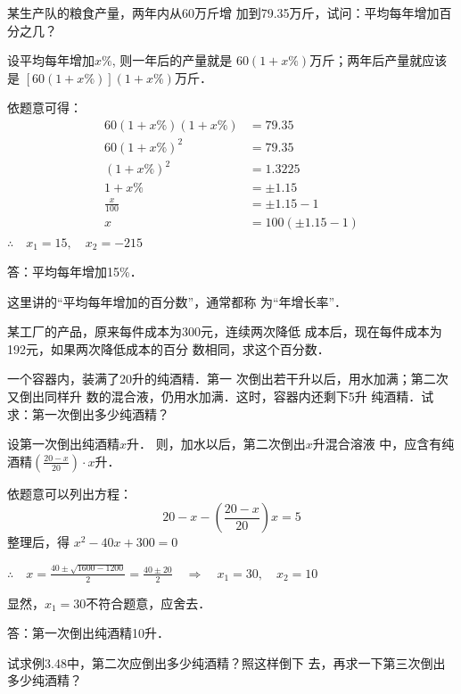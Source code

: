 \begin{example}
某生产队的粮食产量，两年内从60万斤增
加到79.35万斤，试问：平均每年增加百分之几？

\end{example}

\begin{solution}
设平均每年增加$x\%$, 则一年后的产量就是
$60(1+x\%)$万斤；两年后产量就应该是
$[60(1+x\%)](1+x\%)$万斤．

依题意可得：    
\[\begin{split}
    60(1+x\%)(1+x\%)&=79.35\\
60(1+x\%)^2&=79.35\\
(1+x\%)^2&=1.3225\\
1+x\%&=\pm 1.15\\
\frac{x}{100}&=\pm 1.15-1\\
x&=100(\pm 1.15-1)
\end{split}\]
$\therefore\quad x_1=15,\quad x_2=-215$

答：平均每年增加15\%．

这里讲的“平均每年增加的百分数”，通常都称
为“年增长率”．
\end{solution}

\begin{ex}
某工厂的产品，原来每件成本为300元，连续两次降低
成本后，现在每件成本为192元，如果两次降低成本的百分
数相同，求这个百分数．
\end{ex}




\begin{example}
一个容器内，装满了20升的纯酒精．第一
次倒出若干升以后，用水加满；第二次又倒出同样升
数的混合液，仍用水加满．这时，容器内还剩下5升
纯酒精．试求：第一次倒出多少纯酒精？
\end{example}

\begin{solution}
    设第一次倒出纯酒精$x$升．
则，加水以后，第二次倒出$x$升混合溶液
中，应含有纯酒精$\left(\frac{20-x}{20}\right)\cdot x$升．

依题意可以列出方程：
\[20-x-\left(\frac{20-x}{20}\right)x=5\]
整理后，得 $x^2-40x+300=0$

$\therefore\quad x=\frac{40\pm \sqrt{1600-1200}}{2}=\frac{40\pm 20}{2}\quad \Rightarrow\quad x_1=30,\quad x_2=10$

显然，$x_1=30$不符合题意，应舍去．

答：第一次倒出纯酒精10升．
\end{solution}

\begin{ex}
    试求例3.48中，第二次应倒出多少纯酒精？照这样倒下
去，再求一下第三次倒出多少纯酒精？
\end{ex}



